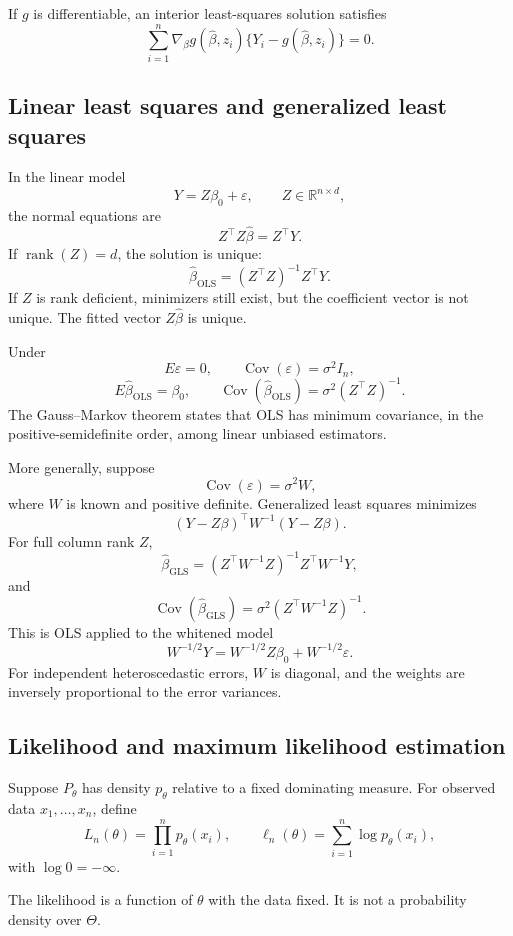 If $g$ is differentiable, an interior least-squares solution satisfies
\[
\sum_{i=1}^n
\nabla_\beta g(\widehat\beta,z_i)
\{Y_i-g(\widehat\beta,z_i)\}=0.
\]

\subsection{Linear least squares and generalized least squares}

In the linear model
\[
Y=Z\beta_0+\varepsilon,
\qquad
Z\in\mathbb R^{n\times d},
\]
the normal equations are
\[
Z^\top Z\widehat\beta=Z^\top Y.
\]
If $\operatorname{rank}(Z)=d$, the solution is unique:
\[
\widehat\beta_{\mathrm{OLS}}
=
(Z^\top Z)^{-1}Z^\top Y.
\]
If $Z$ is rank deficient, minimizers still exist, but the coefficient
vector is not unique. The fitted vector $Z\widehat\beta$ is unique.

Under
\[
E\varepsilon=0,
\qquad
\operatorname{Cov}(\varepsilon)=\sigma^2I_n,
\]
\[
E\widehat\beta_{\mathrm{OLS}}=\beta_0,
\qquad
\operatorname{Cov}(\widehat\beta_{\mathrm{OLS}})
=
\sigma^2(Z^\top Z)^{-1}.
\]
The Gauss--Markov theorem states that OLS has minimum covariance,
in the positive-semidefinite order, among linear unbiased
estimators.

More generally, suppose
\[
\operatorname{Cov}(\varepsilon)=\sigma^2W,
\]
where $W$ is known and positive definite. Generalized least squares
minimizes
\[
(Y-Z\beta)^\top W^{-1}(Y-Z\beta).
\]
For full column rank $Z$,
\[
\widehat\beta_{\mathrm{GLS}}
=
(Z^\top W^{-1}Z)^{-1}Z^\top W^{-1}Y,
\]
and
\[
\operatorname{Cov}(\widehat\beta_{\mathrm{GLS}})
=
\sigma^2(Z^\top W^{-1}Z)^{-1}.
\]
This is OLS applied to the whitened model
\[
W^{-1/2}Y=W^{-1/2}Z\beta_0+W^{-1/2}\varepsilon.
\]
For independent heteroscedastic errors, $W$ is diagonal, and the
weights are inversely proportional to the error variances.

\subsection{Likelihood and maximum likelihood estimation}

Suppose $P_\theta$ has density $p_\theta$ relative to a fixed
dominating measure. For observed data $x_1,\ldots,x_n$, define
\[
L_n(\theta)=\prod_{i=1}^np_\theta(x_i),
\qquad
\ell_n(\theta)=\sum_{i=1}^n\log p_\theta(x_i),
\]
with $\log0=-\infty$.

The likelihood is a function of $\theta$ with the data fixed.
It is not a probability density over $\Theta$.

